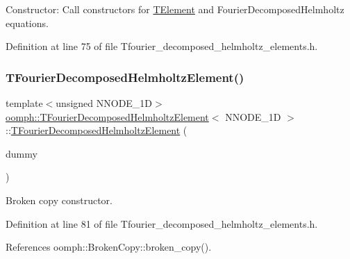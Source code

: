 Constructor\+: Call constructors for \hyperlink{classoomph_1_1TElement}{T\+Element} and Fourier\+Decomposed\+Helmholtz equations. 



Definition at line 75 of file Tfourier\+\_\+decomposed\+\_\+helmholtz\+\_\+elements.\+h.

\mbox{\label{classoomph_1_1TFourierDecomposedHelmholtzElement_ac79fd4aad6d66e90e7f8c0317bb2f26d}} 
\subsubsection{\texorpdfstring{T\+Fourier\+Decomposed\+Helmholtz\+Element()}{TFourierDecomposedHelmholtzElement()}\hspace{0.1cm}{\footnotesize\ttfamily [2/2]}}
{\footnotesize\ttfamily template$<$unsigned N\+N\+O\+D\+E\+\_\+1D$>$ \\
\hyperlink{classoomph_1_1TFourierDecomposedHelmholtzElement}{oomph\+::\+T\+Fourier\+Decomposed\+Helmholtz\+Element}$<$ N\+N\+O\+D\+E\+\_\+1D $>$\+::\hyperlink{classoomph_1_1TFourierDecomposedHelmholtzElement}{T\+Fourier\+Decomposed\+Helmholtz\+Element} (\begin{DoxyParamCaption}\item[{const \hyperlink{classoomph_1_1TFourierDecomposedHelmholtzElement}{T\+Fourier\+Decomposed\+Helmholtz\+Element}$<$ N\+N\+O\+D\+E\+\_\+1D $>$ \&}]{dummy }\end{DoxyParamCaption})\hspace{0.3cm}{\ttfamily [inline]}}



Broken copy constructor. 



Definition at line 81 of file Tfourier\+\_\+decomposed\+\_\+helmholtz\+\_\+elements.\+h.



References oomph\+::\+Broken\+Copy\+::broken\+\_\+copy().



